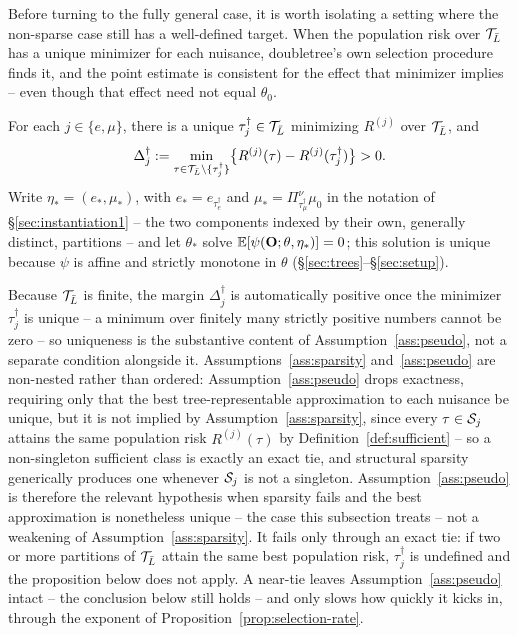 \documentclass[12pt]{article}
\begin{document}
Before turning to the fully general case, it is worth isolating a setting where the non-sparse case still has a well-defined target. When the population risk over $\mathcal{T}_{\bar{L}}$ has a unique minimizer for each nuisance, doubletree's own selection procedure finds it, and the point estimate is consistent for the effect that minimizer implies -- even though that effect need not equal $\theta_0$.

\begin{assumption}\label{ass:pseudo}
For each $j\in\{e,\mu\}$, there is a unique $\tau_j^\dagger\in\mathcal{T}_{\bar{L}}$ minimizing $R^{(j)}$ over $\mathcal{T}_{\bar{L}}$, and
\[
  \Delta_j^\dagger := \min_{\tau\in\mathcal{T}_{\bar{L}}\setminus\{\tau_j^\dagger\}} \bigl\{R^{(j)}(\tau) - R^{(j)}(\tau_j^\dagger)\bigr\} > 0.
\]
Write $\eta_*=(e_*,\mu_*)$, with $e_*=e_{\tau_e^\dagger}$ and $\mu_*=\Pi^\nu_{\tau_\mu^\dagger}\mu_0$ in the notation of \S\ref{sec:instantiation1} -- the two components indexed by their own, generally distinct, partitions -- and let $\theta_*$ solve $\mathbb{E}[\psi(\mathbf{O};\theta,\eta_*)]=0$; this solution is unique because $\psi$ is affine and strictly monotone in $\theta$ (\S\ref{sec:trees}--\S\ref{sec:setup}).
\end{assumption}

Because $\mathcal{T}_{\bar{L}}$ is finite, the margin $\Delta_j^\dagger$ is automatically positive once the minimizer $\tau_j^\dagger$ is unique -- a minimum over finitely many strictly positive numbers cannot be zero -- so uniqueness is the substantive content of Assumption~\ref{ass:pseudo}, not a separate condition alongside it. Assumptions~\ref{ass:sparsity} and~\ref{ass:pseudo} are non-nested rather than ordered: Assumption~\ref{ass:pseudo} drops exactness, requiring only that the best tree-representable approximation to each nuisance be unique, but it is not implied by Assumption~\ref{ass:sparsity}, since every $\tau\in\mathcal{S}_j$ attains the same population risk $R^{(j)}(\tau)$ by Definition~\ref{def:sufficient} -- so a non-singleton sufficient class is exactly an exact tie, and structural sparsity generically produces one whenever $\mathcal{S}_j$ is not a singleton. Assumption~\ref{ass:pseudo} is therefore the relevant hypothesis when sparsity fails and the best approximation is nonetheless unique -- the case this subsection treats -- not a weakening of Assumption~\ref{ass:sparsity}. It fails only through an exact tie: if two or more partitions of $\mathcal{T}_{\bar{L}}$ attain the same best population risk, $\tau_j^\dagger$ is undefined and the proposition below does not apply. A near-tie leaves Assumption~\ref{ass:pseudo} intact -- the conclusion below still holds -- and only slows how quickly it kicks in, through the exponent of Proposition~\ref{prop:selection-rate}.
\end{document}
